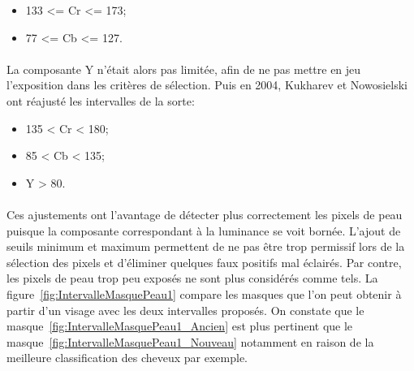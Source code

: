 \documentclass[11pt, french]{report-rd-info}
\begin{document}
\begin{itemize}
\item 133 <= Cr <= 173;
\item 77 <= Cb <= 127.
\end{itemize}

\paragraph*{}
La composante Y n'était alors pas limitée, afin de ne pas mettre en jeu l'exposition dans les critères de sélection.
Puis en 2004, Kukharev et Nowosielski \cite{Kukharev2004} ont réajusté les intervalles de la sorte:

\begin{itemize}
\item 135 < Cr < 180;
\item 85 < Cb < 135;
\item Y > 80.
\end{itemize}

\paragraph*{}
Ces ajustements ont l'avantage de détecter plus correctement les pixels de peau puisque la composante correspondant à la luminance se voit bornée. L'ajout de seuils minimum et maximum permettent de ne pas être trop permissif lors de la sélection des pixels et d'éliminer quelques faux positifs mal éclairés. Par contre, les pixels de peau trop peu exposés ne sont plus considérés comme tels. La figure~\ref{fig:IntervalleMasquePeau1} compare les masques que l'on peut obtenir à partir d'un visage avec les deux intervalles proposés. On constate que le masque~\ref{fig:IntervalleMasquePeau1_Ancien} est plus pertinent que le masque~\ref{fig:IntervalleMasquePeau1_Nouveau} notamment en raison de la meilleure classification des cheveux par exemple.
\end{document}

